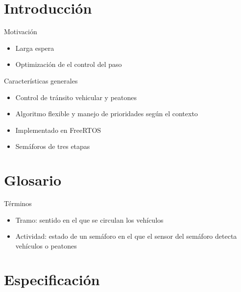 \section{Introducción} 

\begin{frame}
	\begin{block}{Motivación}
		\begin{itemize}
			\item Larga espera
			\item Optimización de el control del paso
		\end{itemize}
	\end{block}

	\begin{block}{Características generales}
		\begin{itemize}
			\item Control de tránsito vehicular y peatones
			\item Algoritmo flexible y manejo de prioridades según el contexto
			\item Implementado en FreeRTOS
			\item Semáforos de tres etapas
		\end{itemize}
	\end{block}
\end{frame}

\section{Glosario}

\begin{frame}
	\begin{block}{Términos}
		\begin{itemize}
			\item Tramo: sentido en el que se circulan los vehículos
			\item Actividad: estado de un semáforo en el que el sensor del semáforo detecta vehículos o peatones
		\end{itemize}
	\end{block}
\end{frame}

\section{Especificación}

